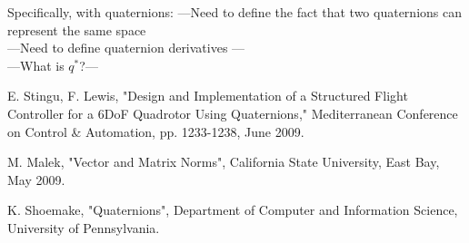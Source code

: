 \documentclass{article}
\numberwithin{equation}{section} %
\begin{document}
Specifically, with quaternions:
---Need to define the fact that two quaternions can represent the same space \\
---Need to define quaternion derivatives --- \\
---What is $q^*$?--- \\



\begin{thebibliography}{99}


	E. Stingu, F. Lewis, 
	"Design and Implementation of a Structured Flight Controller for a 6DoF Quadrotor Using Quaternions," 
Mediterranean Conference on Control \& Automation, pp. 1233-1238, June 2009.


	M. Malek,
	"Vector and Matrix Norms", California State University, East Bay, May 2009.
	
	K. Shoemake,
	"Quaternions", Department of Computer and Information Science, University of Pennsylvania.
	
	
	
\end{thebibliography}
\end{document}

